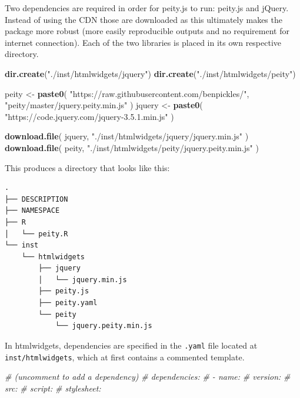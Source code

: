 \documentclass[10pt,]{krantz}
\makeatletter
\newenvironment{Shaded}{\begin{snugshade}}{\end{snugshade}}
\newcommand{\CommentTok}[1]{\textcolor[rgb]{0.37,0.37,0.37}{\textit{#1}}}
\newcommand{\KeywordTok}[1]{\textcolor[rgb]{0.27,0.27,0.27}{\textbf{#1}}}
\newcommand{\NormalTok}[1]{#1}
\newcommand{\StringTok}[1]{\textcolor[rgb]{0.5,0.5,0.5}{#1}}
\newenvironment{kframe}{%
\medskip{}
\setlength{\fboxsep}{.8em}
 \def\at@end@of@kframe{}%
 \ifinner\ifhmode%
  \def\at@end@of@kframe{\end{minipage}}%
  \begin{minipage}{\columnwidth}%
 \fi\fi%
 \def\FrameCommand##1{\hskip\@totalleftmargin \hskip-\fboxsep
 \colorbox{shadecolor}{##1}\hskip-\fboxsep
     \hskip-\linewidth \hskip-\@totalleftmargin \hskip\columnwidth}%
 \MakeFramed {\advance\hsize-\width
   \@totalleftmargin\z@ \linewidth\hsize
   \@setminipage}}%
 {\par\unskip\endMakeFramed%
 \at@end@of@kframe}
\renewenvironment{Shaded}{\begin{kframe}}{\end{kframe}}
\makeatother
\begin{document}
Two dependencies are required in order for peity.js to run: peity.js and jQuery. Instead of using the CDN those are downloaded as this ultimately makes the package more robust (more easily reproducible outputs and no requirement for internet connection). Each of the two libraries is placed in its own respective directory.

\begin{Shaded}
\begin{Highlighting}[]
\KeywordTok{dir.create}\NormalTok{(}\StringTok{"./inst/htmlwidgets/jquery"}\NormalTok{)}
\KeywordTok{dir.create}\NormalTok{(}\StringTok{"./inst/htmlwidgets/peity"}\NormalTok{)}

\NormalTok{peity <-}\StringTok{ }\KeywordTok{paste0}\NormalTok{(}
  \StringTok{"https://raw.githubusercontent.com/benpickles/"}\NormalTok{,}
  \StringTok{"peity/master/jquery.peity.min.js"}
\NormalTok{)}
\NormalTok{jquery <-}\StringTok{ }\KeywordTok{paste0}\NormalTok{(}
  \StringTok{"https://code.jquery.com/jquery-3.5.1.min.js"}
\NormalTok{)}

\KeywordTok{download.file}\NormalTok{(}
\NormalTok{  jquery, }\StringTok{"./inst/htmlwidgets/jquery/jquery.min.js"}
\NormalTok{)}
\KeywordTok{download.file}\NormalTok{(}
\NormalTok{  peity, }\StringTok{"./inst/htmlwidgets/peity/jquery.peity.min.js"}
\NormalTok{)}
\end{Highlighting}
\end{Shaded}

This produces a directory that looks like this:

\begin{verbatim}
.
├── DESCRIPTION
├── NAMESPACE
├── R
│   └── peity.R
└── inst
    └── htmlwidgets
        ├── jquery
        │   └── jquery.min.js
        ├── peity.js
        ├── peity.yaml
        └── peity
            └── jquery.peity.min.js
\end{verbatim}

In htmlwidgets, dependencies are specified in the \texttt{.yaml} file located at \texttt{inst/htmlwidgets}, which at first contains a commented template.

\begin{Shaded}
\begin{Highlighting}[]
\CommentTok{# (uncomment to add a dependency)}
\CommentTok{# dependencies:}
\CommentTok{#  - name:}
\CommentTok{#    version:}
\CommentTok{#    src:}
\CommentTok{#    script:}
\CommentTok{#    stylesheet:}
\end{Highlighting}
\end{Shaded}
\end{document}
